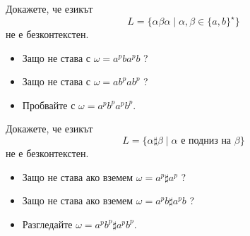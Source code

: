 \begin{problem}
  Докажете, че езикът 
  \[L = \{\alpha\beta\alpha \mid \alpha,\beta \in \{a,b\}^\star\}\]
  не е безконтекстен.
\end{problem}
\begin{hint}
  \begin{itemize}
  \item 
    Защо не става с $\omega = a^pba^pb$ ?
  \item
    Защо не става с $\omega = ab^pab^p$ ?
  \item
    Пробвайте с $\omega = a^pb^pa^pb^p$.
  \end{itemize}
\end{hint}



\begin{problem}
  Докажете, че езикът
  \[L = \{\alpha\sharp\beta \mid \alpha\text{ е подниз на }\beta\}\]
  не е безконтекстен.
\end{problem}
\begin{hint}
  \begin{itemize}
  \item 
    Защо не става ако вземем $\omega = a^p \sharp a^p$ ?
  \item 
    Защо не става ако вземем $\omega = a^pb \sharp a^pb$ ?
  \item
    Разгледайте $\omega = a^pb^p\sharp a^pb^p$.
  \end{itemize}
\end{hint}


